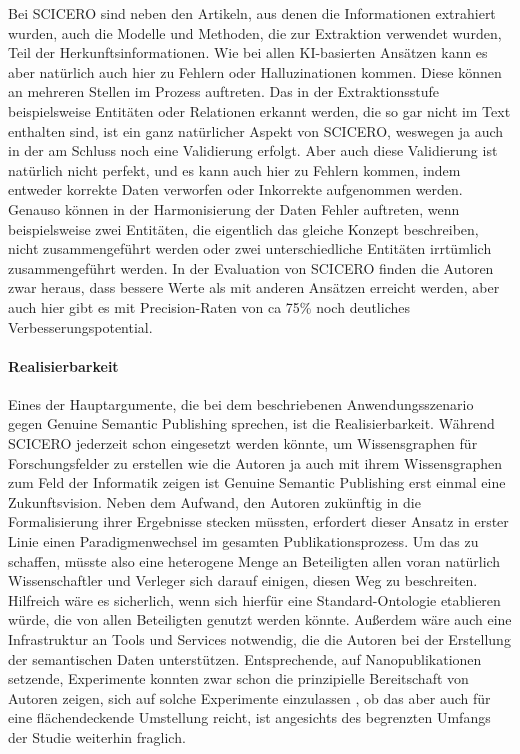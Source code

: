 Bei SCICERO sind neben den Artikeln, aus denen die Informationen extrahiert wurden, auch die Modelle und Methoden, die zur Extraktion verwendet wurden, Teil der Herkunftsinformationen.
Wie bei allen KI-basierten Ansätzen kann es aber natürlich auch hier zu Fehlern oder Halluzinationen kommen.
Diese können an mehreren Stellen im Prozess auftreten.
Das in der Extraktionsstufe beispielsweise Entitäten oder Relationen erkannt werden, die so gar nicht im Text enthalten sind, ist ein ganz natürlicher Aspekt von SCICERO, weswegen ja auch in der am Schluss noch eine Validierung erfolgt.
Aber auch diese Validierung ist natürlich nicht perfekt, und es kann auch hier zu Fehlern kommen, indem entweder korrekte Daten verworfen oder Inkorrekte aufgenommen werden.
Genauso können in der Harmonisierung der Daten Fehler auftreten, wenn beispielsweise zwei Entitäten, die eigentlich das gleiche Konzept beschreiben, nicht zusammengeführt werden oder zwei unterschiedliche Entitäten irrtümlich zusammengeführt werden.
In der Evaluation von SCICERO finden die Autoren zwar heraus, dass bessere Werte als mit anderen Ansätzen erreicht werden, aber auch hier gibt es mit Precision-Raten von ca 75\% noch deutliches Verbesserungspotential.


\paragraph{Realisierbarkeit}

Eines der Hauptargumente, die bei dem beschriebenen Anwendungsszenario gegen Genuine Semantic Publishing sprechen, ist die Realisierbarkeit.
Während SCICERO jederzeit schon eingesetzt werden könnte, um Wissensgraphen für Forschungsfelder zu erstellen \textemdash wie die Autoren ja auch mit ihrem Wissensgraphen zum Feld der Informatik zeigen \cite{cskg} \textemdash ist Genuine Semantic Publishing erst einmal eine Zukunftsvision.
Neben dem Aufwand, den Autoren zukünftig in die Formalisierung ihrer Ergebnisse stecken müssten, erfordert dieser Ansatz in erster Linie einen Paradigmenwechsel im gesamten Publikationsprozess.
Um das zu schaffen, müsste also eine heterogene Menge an Beteiligten \textemdash allen voran natürlich Wissenschaftler und Verleger \textemdash sich darauf einigen, diesen Weg zu beschreiten.
Hilfreich wäre es sicherlich, wenn sich hierfür eine Standard-Ontologie etablieren würde, die von allen Beteiligten genutzt werden könnte.
Außerdem wäre auch eine Infrastruktur an Tools und Services notwendig, die die Autoren bei der Erstellung der semantischen Daten unterstützen.
Entsprechende, auf Nanopublikationen setzende, Experimente konnten zwar schon die prinzipielle Bereitschaft von Autoren zeigen, sich auf solche Experimente einzulassen \cite{nanopub-experiment}, ob das aber auch für eine flächendeckende Umstellung reicht, ist angesichts des begrenzten Umfangs der Studie weiterhin fraglich.

